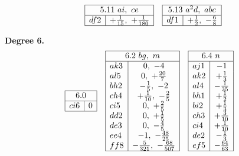 \documentclass[11pt]{article}
\begin{document}
\[
\begin{array}{|l|c|}\hline
\multicolumn{2}{|c|}{5.11\ ai,\ ce}\\\hline
df2 & +\tfrac{1}{15},\ +\tfrac{1}{180} \\\hline
\end{array}\quad
\begin{array}{|l|c|}\hline
\multicolumn{2}{|c|}{5.13\ a^{2}d,\ abc}\\\hline
df1 & +\tfrac{1}{2},\ -\tfrac{6}{8} \\\hline
\end{array}
\]

\medskip

\noindent\textbf{Degree 6.}
\[
\begin{array}{|l|c|}\hline
\multicolumn{2}{|c|}{6.0}\\\hline
ci6 & 0 \\\hline
\end{array}\quad
\begin{array}{|l|c|}\hline
\multicolumn{2}{|c|}{6.2\ bg,\ m}\\\hline
ak3 & 0,\ -4 \\
al5 & 0,\ +\tfrac{20}{7} \\
bh2 & -\tfrac{1}{5},\ -2 \\
ch4 & +\tfrac{1}{10},\ -\tfrac{2}{5} \\
ci5 & 0,\ +\tfrac{2}{5} \\
dd2 & 0,\ +\tfrac{1}{5} \\
de3 & 0,\ -\tfrac{4}{5} \\
ee4 & -1,\ -\tfrac{48}{25} \\
ff8 & -\tfrac{5}{321},\ -\tfrac{68}{507} \\\hline
\end{array}\quad
\begin{array}{|l|c|}\hline
\multicolumn{2}{|c|}{6.4\ n}\\\hline
aj1 & -1 \\
ak2 & +\tfrac{1}{3} \\
al4 & -\tfrac{1}{35} \\
bh1 & +\tfrac{1}{2} \\
bi2 & +\tfrac{1}{3} \\
ch3 & +\tfrac{3}{10} \\
ci4 & +\tfrac{1}{10} \\
de2 & -\tfrac{1}{3} \\
ef5 & -\tfrac{64}{63} \\\hline
\end{array}\quad
\begin{array}{|l|c|}\hline

\end{array}\]
\end{document}
